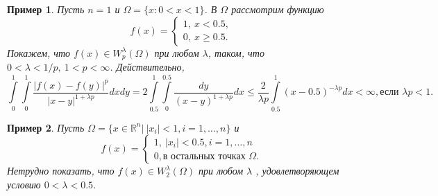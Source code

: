 \documentclass[9pt]{article}
\newtheorem{example}{Пример} %
\begin{document}
	\begin{example}
		Пусть $n=1$ и $\Omega = \{x: 0 < x < 1\}$. В $\Omega$ рассмотрим функцию 
		\begin{equation*}
			f(x) = \begin{cases}
				1, \ x < 0.5, \\
				0, \ x \geq 0.5.
			\end{cases}
		\end{equation*}
		 Покажем, что $f(x) \in W^\lambda_p(\Omega)$ при любом $\lambda $, таком, что $0 < \lambda < 1/p, \ 1 < p < \infty$. Действительно, 
		 $$
		 \int\limits_0^1 \int \limits_0^1 \dfrac{|f(x) - f(y)|^p}{|x-y|^{1+\lambda p}}dx dy = 2 \int\limits_{0.5}^1 \int\limits_{0}^{0.5} \dfrac{dy}{(x-y)^{1 + \lambda p}} dx \leq \dfrac{2}{\lambda p} \int\limits_{0.5}^1 (x - 0.5)^{-\lambda p} dx < \infty, \text{если } \lambda p < 1.
		 $$
	\end{example}
	\begin{example}
		Пусть $\Omega = \{x \in \mathbb{R}^n\vert \ |x_i| < 1, i = 1, \dots, n\}$ и 
		\begin{equation*}
			f(x) = \begin{cases}
				1, \ |x_i| < 0.5, i = 1, \dots, n \\
				0, \text{в остальных точках } \Omega.
			\end{cases}
		\end{equation*}
		Нетрудно показать, что $f(x) \in W^\lambda_2(\Omega)$ при любом $\lambda$ , удовлетворяющем условию $0 < \lambda < 0.5$.
		
	\end{example}
\end{document}

